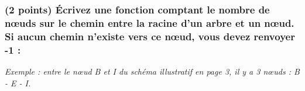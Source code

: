 \documentclass[11pt,a4paper]{article}
\begin{document}
%


\subsubsection{(2 points) \'Ecrivez une fonction comptant le nombre de nœuds sur le chemin entre la racine d'un arbre et un nœud. Si aucun chemin n'existe vers ce nœud, vous devez renvoyer -1 : }

\noindent \textit{Exemple : entre le nœud B et I du schéma illustratif en page 3, il y a 3 nœuds : B - E - I.}


\begin{center}
\end{center}

\clearpage




%
%
%
%
%
\end{document}
